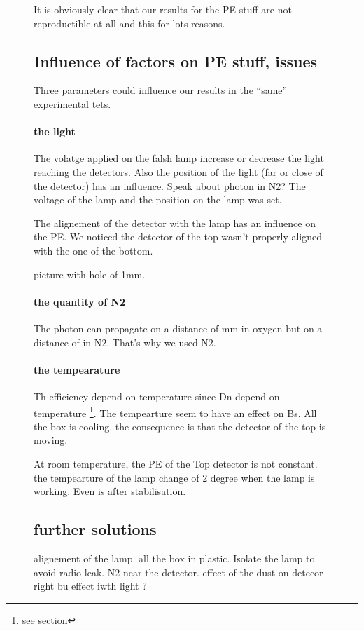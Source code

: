 \begin{figure}[!hbtp]
  It is obviously  clear that our results for  the PE stuff are not reproductible at all and this for lots reasons.
  
  \subsection{Influence of factors on PE stuff, issues}
  
  Three parameters could influence our results in the ``same'' experimental tets.
  
  \paragraph{the light}
  
  The volatge applied on the falsh lamp increase or decrease the light reaching the detectors. Also the position of the light (far or close of 
  the detector) has an influence. Speak about photon in N2? 
  The voltage of the lamp and the position on the lamp was set. 
  
  
  The alignement of the detector with the lamp has an influence on the PE. We noticed the detector of the top wasn't properly aligned with the 
  one of the bottom. 
  
  picture with hole of 1mm. 
  
  \paragraph{the quantity of N2}
  
  The photon can propagate on a distance of mm  in oxygen but on a distance of in N2. That's why we used N2. 
  
  \paragraph{the tempearature}
  
  Th efficiency depend on temperature since Dn depend on temperature \footnote{see section}. 
  The tempearture seem to have an effect on Bs. All the box is cooling. the consequence is that the detector of the top is moving. 
  
  At room temperature, the PE of the Top detector is not constant. the tempearture of the lamp change of 2 degree when the lamp is working. 
  Even is after stabilisation.
  
  
  
  \subsection{further solutions}
  alignement of the lamp. all the box in plastic. Isolate the lamp to avoid radio leak. N2 near the detector. 
  effect of the dust on detecor right bu effect iwth light ? 
  

\end{figure}
